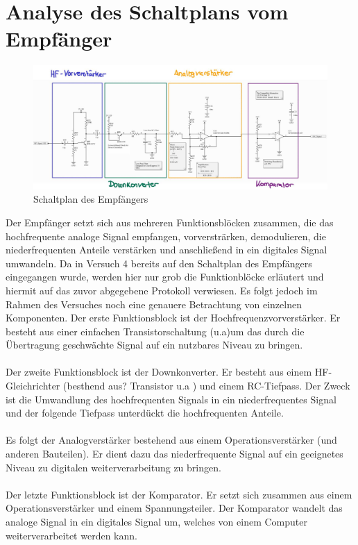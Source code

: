 \section{Analyse des Schaltplans vom Empfänger} %
\begin{figure}[H]
    \centering
    \includegraphics[width=1\textwidth]{Pictures/Schaltbild.jpg}
    \caption{Schaltplan des Empfängers}
    \label{fig:opamp_schaltung}
\end{figure}
Der Empfänger setzt sich aus mehreren Funktionsblöcken zusammen, die das hochfrequente analoge Signal empfangen, vorversträrken,
demodulieren, die niederfrequenten Anteile verstärken und anschließend in ein digitales Signal umwandeln. Da in Versuch 4 bereits auf den
Schaltplan des Empfängers eingegangen wurde, werden hier nur grob die Funktionblöcke erläutert und hiermit auf das zuvor abgegebene Protokoll verwiesen.
Es folgt jedoch im Rahmen des Versuches noch eine genauere Betrachtung von einzelnen Komponenten. 
\clearpage
Der erste Funktionsblock ist der Hochfrequenzvorverstärker. Er besteht aus einer einfachen Transistorschaltung (u.a)um das durch die Übertragung
geschwächte Signal auf ein nutzbares Niveau zu bringen. \\\\
Der zweite Funktionsblock ist der Downkonverter. Er besteht aus einem HF-Gleichrichter (besthend aus? Transistor u.a ) und einem RC-Tiefpass. Der Zweck ist
die Umwandlung des hochfrequenten Signals in ein niederfrequentes Signal und der folgende Tiefpass unterdückt die hochfrequenten
Anteile. \\\\
Es folgt der Analogverstärker bestehend aus einem Operationsverstärker (und anderen Bauteilen). Er dient dazu das niederfrequente Signal
auf ein geeignetes Niveau zu digitalen weiterverarbeitung zu bringen.\\ \\
Der letzte Funktionsblock ist der Komparator. Er setzt sich zusammen aus einem Operationsverstärker und einem Spannungsteiler. 
Der Komparator wandelt das analoge Signal in ein digitales Signal um, welches von einem Computer weiterverarbeitet werden kann. 



